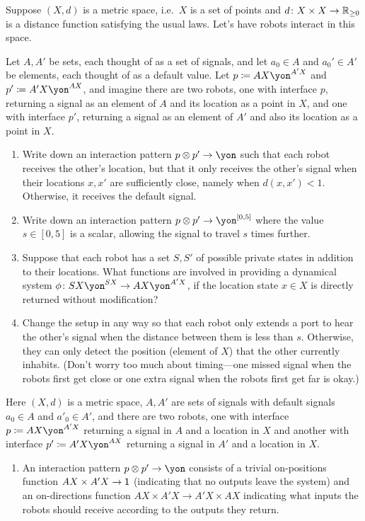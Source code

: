 \documentclass[Book-Poly]{subfiles}
\begin{document}
\begin{exercise}
Suppose $(X,d)$ is a metric space, i.e.\ $X$ is a set of points and $d\colon X\times X\to\mathbb{R}_{\geq0}$ is a distance function satisfying the usual laws.
Let's have robots interact in this space.

Let $A,A'$ be sets, each thought of as a set of signals, and let $a_0\in A$ and $a_0'\in A'$ be elements, each thought of as a default value. Let $p\coloneqq AX\yon^{A'X}$ and $p'\coloneqq A'X\yon^{AX}$, and imagine there are two robots, one with interface $p$, returning a signal as an element of $A$ and its location as a point in $X$, and one with interface $p'$, returning a signal as an element of $A'$ and also its location as a point in $X$.
\begin{enumerate}
	\item Write down an interaction pattern $p\otimes p'\to\yon$ such that each robot receives the other's location, but that it only receives the other's signal when their locations $x,x'$ are sufficiently close, namely when $d(x,x')<1$.
	Otherwise, it receives the default signal.
	\item Write down an interaction pattern $p\otimes p'\to\yon^{[0,5]}$ where the value $s\in [0,5]$ is a scalar, allowing the signal to travel $s$ times further.
	\item Suppose that each robot has a set $S,S'$ of possible private states in addition to their locations.
	What functions are involved in providing a dynamical system $\phi\colon SX\yon^{SX}\to AX\yon^{A'X}$, if the location state $x\in X$ is directly returned without modification?
	\item Change the setup in any way so that each robot only extends a port to hear the other's signal when the distance between them is less than $s$. Otherwise, they can only detect the position (element of $X$) that the other currently inhabits.
	(Don't worry too much about timing---one missed signal when the robots first get close or one extra signal when the robots first get far is okay.)
\qedhere
\end{enumerate}
\begin{solution}
Here $(X,d)$ is a metric space, $A,A'$ are sets of signals with default signals $a_0\in A$ and $a'_0\in A'$, and there are two robots, one with interface $p\coloneqq AX\yon^{A'X}$ returning a signal in $A$ and a location in $X$ and another with interface $p'\coloneqq A'X\yon^{AX}$ returning a signal in $A'$ and a location in $X$.
\begin{enumerate}
    \item An interaction pattern $p\otimes p'\to\yon$ consists of a trivial on-positions function $AX\times A'X\to\textsf{1}$ (indicating that no outputs leave the system) and an on-directions function $AX\times A'X\to A'X\times AX$ indicating what inputs the robots should receive according to the outputs they return.

\end{enumerate}
\end{solution}
\end{exercise}
\end{document}
